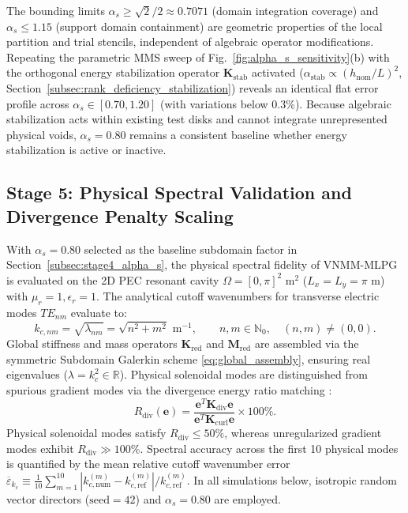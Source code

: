 \documentclass[VANCOUVER,Times1COL]{WileyNJD-v5}
\begin{document}
\begin{remark}
    The bounding limits $\alpha_s \ge \sqrt{2}/2 \approx 0.7071$ (domain integration coverage) and $\alpha_s \le 1.15$ (support domain containment) are geometric properties of the local partition and trial stencils, independent of algebraic operator modifications. Repeating the parametric MMS sweep of Fig.~\ref{fig:alpha_s_sensitivity}(b) with the orthogonal energy stabilization operator $\mathbf{K}_{\mathrm{stab}}$ activated ($\alpha_{\mathrm{stab}} \propto (h_{\mathrm{nom}}/L)^2$, Section~\ref{subsec:rank_deficiency_stabilization}) reveals an identical flat error profile across $\alpha_s \in [0.70, 1.20]$ (with variations below $0.3\%$). Because algebraic stabilization acts within existing test disks and cannot integrate unrepresented physical voids, $\alpha_s = 0.80$ remains a consistent baseline whether energy stabilization is active or inactive.
\end{remark}

\subsection{Stage 5: Physical Spectral Validation and Divergence Penalty Scaling}
\label{subsec:stage5_cavity}

With $\alpha_s = 0.80$ selected as the baseline subdomain factor in Section~\ref{subsec:stage4_alpha_s}, the physical spectral fidelity of VNMM-MLPG is evaluated on the 2D PEC resonant cavity $\Omega = [0, \pi]^2\text{ m}^2$ ($L_x = L_y = \pi\text{ m}$) with $\mu_r = 1, \epsilon_r = 1$. The analytical cutoff wavenumbers for transverse electric modes $TE_{nm}$ evaluate to:
\begin{equation}
    k_{c, nm} = \sqrt{\lambda_{nm}} = \sqrt{n^2 + m^2}\text{ m}^{-1}, \qquad n, m \in \mathbb{N}_0, \quad (n, m) \ne (0, 0).
    \label{eq:analytical_cavity_kc}
\end{equation}
Global stiffness and mass operators $\mathbf{K}_{\mathrm{red}}$ and $\mathbf{M}_{\mathrm{red}}$ are assembled via the symmetric Subdomain Galerkin scheme \eqref{eq:global_assembly}, ensuring real eigenvalues ($\lambda = k_c^2 \in \mathbb{R}$). Physical solenoidal modes are distinguished from spurious gradient modes via the divergence energy ratio matching \cite{stable_vnmm2d_2026}:
\begin{equation}
    R_{\mathrm{div}}(\mathbf{e}) = \frac{\mathbf{e}^T \mathbf{K}_{\mathrm{div}} \mathbf{e}}{\mathbf{e}^T \mathbf{K}_{\mathrm{curl}} \mathbf{e}} \times 100\%.
    \label{eq:R_div_definition}
\end{equation}
Physical solenoidal modes satisfy $R_{\mathrm{div}} \le 50\%$, whereas unregularized gradient modes exhibit $R_{\mathrm{div}} \gg 100\%$. Spectral accuracy across the first 10 physical modes is quantified by the mean relative cutoff wavenumber error $\overline{\varepsilon}_{k_c} \equiv \frac{1}{10}\sum_{m=1}^{10} |k_{c, \mathrm{num}}^{(m)} - k_{c, \mathrm{ref}}^{(m)}| / k_{c, \mathrm{ref}}^{(m)}$. In all simulations below, isotropic random vector directors ($\text{seed}=42$) and $\alpha_s = 0.80$ are employed.
\end{document}
